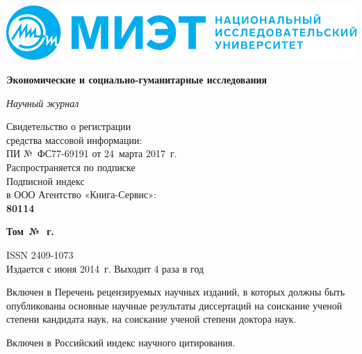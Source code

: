 \pagestyle{empty}
\begin{center}
  \includegraphics[width=\textwidth]{logo}
\vspace{3mm}

{\fontsize{16pt}{20pt}\selectfont\bfseries Экономические и социально-гуманитарные исследования \par}

{\itshape Научный журнал}
\end{center}

\noindent
\begin{minipage}{.5\textwidth}
  \small
Свидетельство о регистрации\\
средства массовой информации:\\
ПИ № ФС77-69191 от 24 марта 2017 г.\\
Распространяется по подписке\\
Подписной индекс\\
в ООО Агентство «Книга-Сервис»:\\
\textbf{80114}
\end{minipage}%
\begin{minipage}{.5\textwidth}
\begin{flushright}
  {\fontsize{16pt}{20pt}\selectfont\bfseries Том\, \esgiVol{} №\, \esgiNum{}
  \esgiYear\,г.\par}

  \vspace{5mm}
  \small
  ISSN 2409-1073\\
  Издается с июня 2014 г. Выходит 4 раза в год
\end{flushright}
\end{minipage}

\begin{flushleft}
  \small
  Включен в Перечень рецензируемых научных изданий, в которых должны быть опубликованы
основные научные результаты диссертаций на соискание ученой степени кандидата наук,
на соискание ученой степени доктора наук.

\vspace{5mm}
Включен в Российский индекс научного цитирования.
\end{flushleft}

\vspace{2cm}

